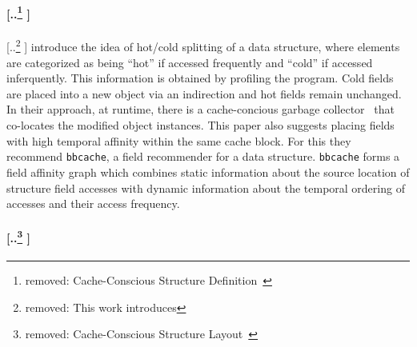 \documentclass[acmsmall,review,anonymous]{acmart}\settopmatter{printfolios=true,printccs=false,printacmref=false}
\providecommand{\DIFaddtex}[1]{{\protect\color{blue} \sf #1}} %
\providecommand{\DIFdeltex}[1]{{\protect\color{red} [..\footnote{removed: #1} ]}} %
\providecommand{\DIFaddbegin}{} %
\providecommand{\DIFaddend}{} %
\providecommand{\DIFdelbegin}{} %
\providecommand{\DIFdelend}{} %
\providecommand{\DIFadd}[1]{\texorpdfstring{\DIFaddtex{#1}}{#1}} %
\providecommand{\DIFdel}[1]{\texorpdfstring{\DIFdeltex{#1}}{}} %
\newcommand{\DIFscaledelfig}{0.5}
\newlength{\DIFdelgraphicswidth} %
\newlength{\DIFdelgraphicsheight} %
\newcommand{\DIFaddincludegraphics}[2][]{{\color{blue}\fbox{\DIFOincludegraphics[#1]{#2}}}} %
\newcommand{\DIFdelincludegraphics}[2][]{%
\sbox{\DIFdelgraphicsbox}{\DIFOincludegraphics[#1]{#2}}%
\settoboxwidth{\DIFdelgraphicswidth}{\DIFdelgraphicsbox} %
\settoboxtotalheight{\DIFdelgraphicsheight}{\DIFdelgraphicsbox} %
\scalebox{\DIFscaledelfig}{%
\parbox[b]{\DIFdelgraphicswidth}{\usebox{\DIFdelgraphicsbox}\\[-\baselineskip] \rule{\DIFdelgraphicswidth}{0em}}\llap{\resizebox{\DIFdelgraphicswidth}{\DIFdelgraphicsheight}{%
\setlength{\unitlength}{\DIFdelgraphicswidth}%
\begin{picture}(1,1)%
\thicklines\linethickness{2pt} %
{\color[rgb]{1,0,0}\put(0,0){\framebox(1,1){}}}%
{\color[rgb]{1,0,0}\put(0,0){\line( 1,1){1}}}%
{\color[rgb]{1,0,0}\put(0,1){\line(1,-1){1}}}%
\end{picture}%
}\hspace*{3pt}}} %
} %
\DeclareRobustCommand{\DIFaddbegin}{\DIFOaddbegin \let\includegraphics\DIFaddincludegraphics} %
\DeclareRobustCommand{\DIFaddend}{\DIFOaddend \let\includegraphics\DIFOincludegraphics} %
\DeclareRobustCommand{\DIFdelbegin}{\DIFOdelbegin \let\includegraphics\DIFdelincludegraphics} %
\DeclareRobustCommand{\DIFdelend}{\DIFOaddend \let\includegraphics\DIFOincludegraphics} %
\begin{document}
\DIFdelbegin \paragraph{\DIFdel{Cache-Conscious Structure Definition~\cite{CSD}}}
\addtocounter{paragraph}{-1}%
\DIFdel{This work introduces }\DIFdelend \DIFaddbegin \DIFadd{\citet{CSD} introduce }\DIFaddend the idea of hot/cold splitting of a data structure, where elements are categorized as being ``hot'' if accessed frequently and ``cold'' if accessed inferquently.
This information is obtained by profiling the program. Cold fields are placed into a new object via an indirection and hot fields remain unchanged. In their approach, at runtime, there is a cache-concious garbage collector~\cite{ccgarbage} that co-locates the modified object instances.
This paper also suggests placing fields with high temporal affinity within the same cache block. For this they recommend  \texttt{bbcache}, a field recommender for a data structure. \texttt{bbcache} forms a field affinity graph which combines static information about the source location of structure field accesses with dynamic information about the temporal ordering of accesses and their access frequency.




\DIFdelbegin \paragraph{\DIFdel{Cache-Conscious Structure Layout~\cite{CSL}}}
\addtocounter{paragraph}{-1}%
\end{document}
